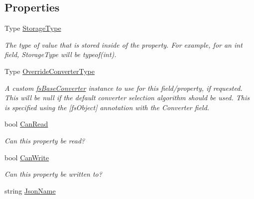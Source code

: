 \subsection*{Properties}
\begin{DoxyCompactItemize}
\item 
Type \hyperlink{class_full_serializer_1_1_internal_1_1fs_meta_property_a5476e7a183ff2ccee14d5dce5d990f3a}{Storage\+Type}
\begin{DoxyCompactList}\small\item\em The type of value that is stored inside of the property. For example, for an int field, Storage\+Type will be typeof(int). \end{DoxyCompactList}\item 
Type \hyperlink{class_full_serializer_1_1_internal_1_1fs_meta_property_a6c973be921f0432b68d33cb1fab4e22e}{Override\+Converter\+Type}
\begin{DoxyCompactList}\small\item\em A custom \hyperlink{class_full_serializer_1_1fs_base_converter}{fs\+Base\+Converter} instance to use for this field/property, if requested. This will be null if the default converter selection algorithm should be used. This is specified using the \mbox{[}fs\+Object\mbox{]} annotation with the Converter field. \end{DoxyCompactList}\item 
bool \hyperlink{class_full_serializer_1_1_internal_1_1fs_meta_property_aaf026b2fbb58e4b707af810ad65c7f22}{Can\+Read}
\begin{DoxyCompactList}\small\item\em Can this property be read? \end{DoxyCompactList}\item 
bool \hyperlink{class_full_serializer_1_1_internal_1_1fs_meta_property_a9ecddc5a8d103dffb6aee1ce4754ee64}{Can\+Write}
\begin{DoxyCompactList}\small\item\em Can this property be written to? \end{DoxyCompactList}\item 
string \hyperlink{class_full_serializer_1_1_internal_1_1fs_meta_property_aefcde74e1d25d5cf01585533f8a54bfd}{Json\+Name}

\end{DoxyCompactItemize}
